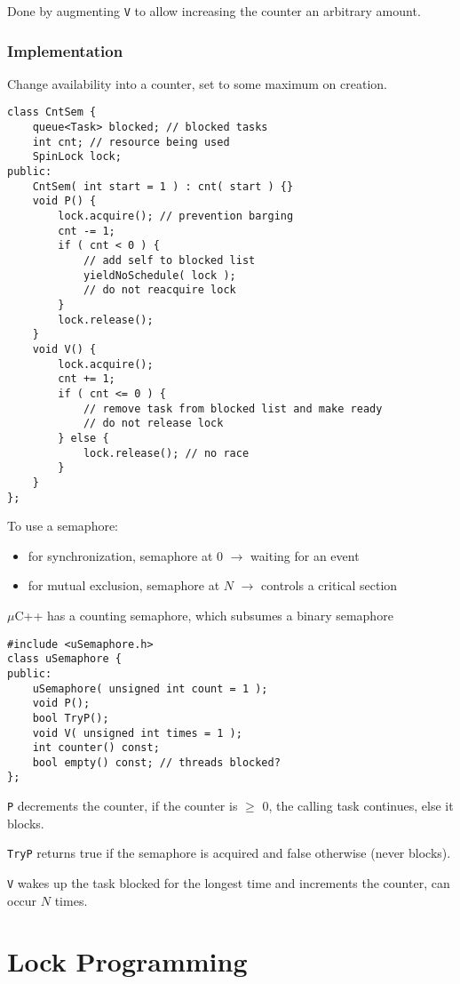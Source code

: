 \documentclass[11pt]{article}
\begin{document}
Done by augmenting \texttt{V} to allow increasing the counter an arbitrary amount.
\subsubsection{Implementation}
\label{sec:org6283100}
Change availability into a counter, set to some maximum on creation.

\begin{verbatim}
class CntSem {
    queue<Task> blocked; // blocked tasks
    int cnt; // resource being used
    SpinLock lock;
public:
    CntSem( int start = 1 ) : cnt( start ) {}
    void P() {
        lock.acquire(); // prevention barging
        cnt -= 1;
        if ( cnt < 0 ) {
            // add self to blocked list
            yieldNoSchedule( lock );
            // do not reacquire lock
        }
        lock.release();
    }
    void V() {
        lock.acquire();
        cnt += 1;
        if ( cnt <= 0 ) {
            // remove task from blocked list and make ready
            // do not release lock
        } else {
            lock.release(); // no race
        }
    }
};
\end{verbatim}

To use a semaphore:
\begin{itemize}
\item for synchronization, semaphore at 0 \(\to\) waiting for an event
\item for mutual exclusion, semaphore at \(N\) \(\to\) controls a critical section
\end{itemize}

\(\mu\)C++ has a counting semaphore, which subsumes a binary semaphore
\begin{verbatim}
#include <uSemaphore.h>
class uSemaphore {
public:
    uSemaphore( unsigned int count = 1 );
    void P();
    bool TryP();
    void V( unsigned int times = 1 );
    int counter() const;
    bool empty() const; // threads blocked?
};
\end{verbatim}

\texttt{P} decrements the counter, if the counter is \(\ge\) 0, the calling task continues, else it blocks.

\texttt{TryP} returns true if the semaphore is acquired and false otherwise (never blocks).

\texttt{V} wakes up the task blocked for the longest time and increments the counter, can occur \(N\) times.
\section{Lock Programming}
\label{sec:orgbbb0712}
\end{document}
